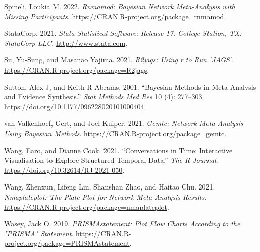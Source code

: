 \begin{CSLReferences}{1}{0}
\leavevmode{}%
Spineli, Loukia M. 2022. \emph{Rnmamod: Bayesian Network Meta-Analysis with Missing Participants}. \url{https://CRAN.R-project.org/package=rnmamod}.

\leavevmode{}%
StataCorp. 2021. \emph{{Stata Statistical Software: Release 17}. College Station, TX: StataCorp LLC}. \url{http://www.stata.com}.

\leavevmode{}%
Su, Yu-Sung, and Masanao Yajima. 2021. \emph{R2jags: Using r to Run 'JAGS'}. \url{https://CRAN.R-project.org/package=R2jags}.

\leavevmode{}%
Sutton, Alex J, and Keith R Abrams. 2001. {``Bayesian Methods in Meta-Analysis and Evidence Synthesis.''} \emph{Stat Methods Med Res} 10 (4): 277--303. \url{https://doi.org/10.1177/096228020101000404}.

\leavevmode{}%
van Valkenhoef, Gert, and Joel Kuiper. 2021. \emph{Gemtc: Network Meta-Analysis Using Bayesian Methods}. \url{https://CRAN.R-project.org/package=gemtc}.

\leavevmode{}%
Wang, Earo, and Dianne Cook. 2021. {``Conversations in Time: Interactive Visualisation to Explore Structured Temporal Data.''} \emph{The R Journal}. \url{https://doi.org/10.32614/RJ-2021-050}.

\leavevmode{}%
Wang, Zhenxun, Lifeng Lin, Shanshan Zhao, and Haitao Chu. 2021. \emph{Nmaplateplot: The Plate Plot for Network Meta-Analysis Results}. \url{https://CRAN.R-project.org/package=nmaplateplot}.

\leavevmode{}%
Wasey, Jack O. 2019. \emph{PRISMAstatement: Plot Flow Charts According to the "PRISMA" Statement}. \url{https://CRAN.R-project.org/package=PRISMAstatement}.

\end{CSLReferences}



\address{%
Loukia M. Spineli\\
Midwifery Research and Education Unit\\%
Hannover Medical School\\ Carl-Neuber-Strasse 1, 30625, Hannover, Germany\\
%
\url{https://www.github.com/LoukiaSpin}\\%
\textit{ORCiD: \href{https://orcid.org/0000-0001-9515-582X}{0000-0001-9515-582X}}\\%
\href{mailto:Spineli.Loukia@mh-hannover.de}{\nolinkurl{Spineli.Loukia@mh-hannover.de}}%
}

